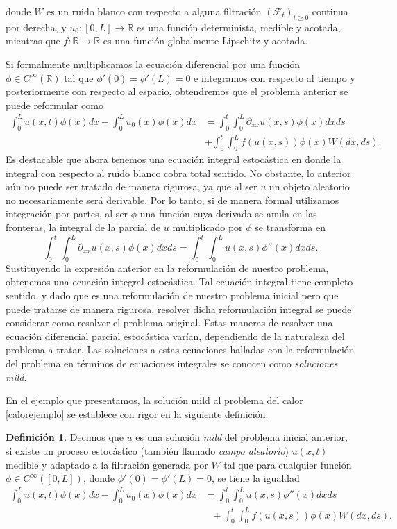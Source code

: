 \documentclass[letterpaper,twoside,12pt]{book}
\newcommand{\R}{\mathbb{R}}
\newcommand{\F}{\mathcal{F}}
\newcommand{\W}{\dot{W}}
\newcommand{\1}{\mathds{1}}
\renewcommand{\to}{\rightarrow}
\theoremstyle{definition}
\newtheorem{dfn}{Definición}
\theoremstyle{definition}
\theoremstyle{remark}
\theoremstyle{definition}
\theoremstyle{definition}
\theoremstyle{definition}
\theoremstyle{definition}
\theoremstyle{definition}
\begin{document}
donde $\W$ es un ruido blanco con respecto a alguna filtración $(\F_t)_{t\geq0}$ continua por derecha, y $u_0:[0,L]\to\R$ es una función determinista, medible y acotada, mientras que $f:\R\to\R$ es una función globalmente Lipschitz y acotada.

Si formalmente multiplicamos la ecuación diferencial por una función $\phi \in C^{\infty}(\R)$ tal que $\phi'(0)=\phi'(L)=0$ e integramos con respecto al tiempo y posteriormente con respecto al espacio, obtendremos que el problema anterior se puede reformular como 
\begin{align*}
   \int_{0}^{L}u(x,t)\phi(x)dx-\int_{0}^{L}u_0(x)\phi(x)dx&=\int_0^{t}\int_0^{L}\partial_{xx}u(x,s)\phi(x)dx ds\\
   &+\int_{0}^{t}\int_{0}^{L}f(u(x,s))\phi(x)W(dx, ds).    
   \end{align*}
Es destacable que ahora tenemos una ecuación integral estocástica en donde la integral con respecto al ruido blanco cobra total sentido. No obstante, lo anterior aún no puede ser tratado de manera rigurosa, ya que al ser $u$ un objeto aleatorio no necesariamente será derivable. Por lo tanto, si de manera formal utilizamos integración por partes, al ser $\phi$ una función cuya derivada se anula en las fronteras, la integral de la parcial de $u$ multiplicado por $\phi$ se transforma en
\[
   \int_{0}^{t}\int_{0}^{L}\partial_{xx}u(x,s)\phi(x)dx ds=\int_{0}^{t}\int_{0}^{L}u(x,s)\phi''(x)dx ds.
\]
Sustituyendo la expresión anterior en la reformulación de nuestro problema, obtenemos una ecuación integral estocástica. Tal ecuación integral tiene completo sentido, y dado que es una reformulación de nuestro problema inicial pero que puede tratarse de manera rigurosa, resolver dicha reformulación integral se puede considerar como resolver el problema original. Estas maneras de resolver una ecuación diferencial parcial estocástica varían, dependiendo de la naturaleza del problema a tratar. Las soluciones a estas ecuaciones halladas con la reformulación del problema en términos de ecuaciones integrales se conocen como \textit{soluciones mild}.

En el ejemplo que presentamos, la solución mild al problema del calor \eqref{calorejemplo} se establece con rigor en la siguiente definición.

\begin{dfn} 
Decimos que $u$ es una solución \textit{mild} del problema inicial anterior, si existe un proceso estocástico (también llamado \textit{campo aleatorio}) $u(x,t)$ medible y adaptado a la filtración generada por $W$ tal que para cualquier función $\phi\in C^{\infty}([0,L])$, donde $\phi'(0)=\phi'(L)=0$, se tiene la igualdad 
\begin{align*}
   \int_{0}^{L}u(x,t)\phi(x)dx-\int_{0}^{L}u_0(x)\phi(x)dx&=\int_{0}^{t}\int_{0}^{L}u(x,s)\phi''(x)dx ds\\
   & \ \ \ +\int_{0}^{t}\int_{0}^{L}f(u(x,s))\phi(x)W(dx, ds).  
\end{align*}
\end{dfn}
\end{document}
